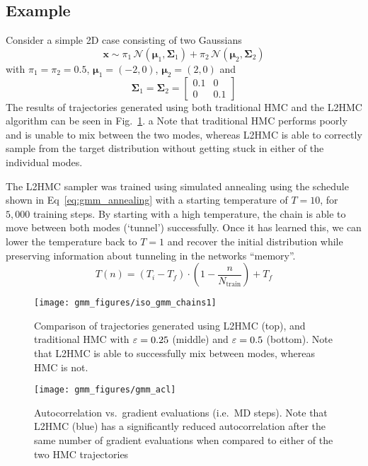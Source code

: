 \documentclass[../main.tex]{subfiles}
\begin{document}
\subsection{Example}
%
Consider a simple 2D case consisting of two Gaussians 
%
\begin{equation}
    \mathbf{x} \sim \pi_1 \,\mathcal{N}(\bm{\mu}_1, \bm{\Sigma}_1) +
        \pi_2\, \mathcal{N}(\bm{\mu}_2, \bm{\Sigma}_2)
    \label{eq:log_likelihood_example}
\end{equation}
%
with $\pi_1 = \pi_2 = 0.5$, $\bm{\mu}_1 = (-2, 0)$, $\bm{\mu}_2 = (2, 0)$ and
%
\begin{equation}
    \bm{\Sigma}_1 = \bm{\Sigma}_2 = 
        \begin{bmatrix}
            0.1    & 0 \\
            0       & 0.1 
        \end{bmatrix}
    \label{eq:covariance_matrix}
\end{equation}
%
The results of trajectories generated using both traditional HMC and the L2HMC
algorithm can be seen in Fig.~\ref{fig:gmm_trajectories}.
a
Note that traditional HMC performs poorly and is unable to mix between the two
modes, whereas L2HMC is able to correctly sample from the target distribution
without getting stuck in either of the individual modes.

%
The L2HMC sampler was trained using simulated annealing using the schedule
shown in Eq~\ref{eq:gmm_annealing} with a starting temperature of $T = 10$, for
$5,000$ training steps.
%
By starting with a high temperature, the chain is able to move between both
modes (`tunnel') successfully.
%
Once it has learned this, we can lower the temperature back to $T = 1$ and
recover the initial distribution while preserving information about tunneling
in the networks ``memory''.
%
\begin{equation}
  T(n) = {\left(T_{i} - T_{f}\right)} \cdot {\left(1 -
  \frac{n}{N_{\mathrm{train}}}\right)} + T_{f} 
\label{eq:gmm_annealing}
\end{equation}
%
\begin{figure}[htbp]
    \centering
    \texttt{[image: gmm\_figures/iso\_gmm\_chains1]}
    \caption{Comparison of trajectories generated using L2HMC (top), and
        traditional HMC with ${\varepsilon} = 0.25$ (middle) and ${\varepsilon} = 0.5$ (bottom).
        Note that L2HMC is able to successfully mix between modes, whereas HMC
        is not.}%
\label{fig:gmm_trajectories}
\end{figure}
%
\begin{figure}[htbp]
    \centering
    \texttt{[image: gmm\_figures/gmm\_acl]}
    \caption{Autocorrelation vs.\ gradient evaluations (i.e.\ MD steps). Note
    that L2HMC (blue) has a significantly reduced autocorrelation after the
  same number of gradient evaluations when compared to either of the two HMC
trajectories}%
\label{fig:gmm_autocorrelation} 
\end{figure}
%
\end{document}
